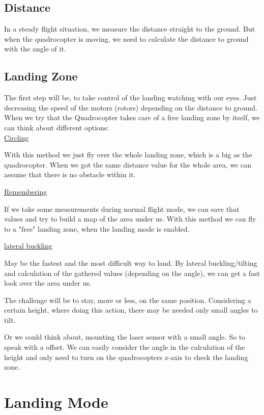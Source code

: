 \subsection{Distance}

In a steady flight situation, we measure the distance straight to the ground. But when the quadrocopter is moving, we need to calculate the distance to ground with the angle of it.


\subsection{Landing Zone}

The first step will be, to take control of the landing watching with our eyes. Just decreasing the speed of the motors (rotors) depending on the distance to ground.\\

When we try that the Quadrocopter takes care of a free landing zone by itself, we can think about different options:\\

\underline{Circling}

With this method we just fly over the whole landing zone, which is a big as the quadrocopter. When we got the same distance value for the whole area, we can assume that there is no obstacle within it.


\underline{Remembering}

If we take some measurements during normal flight mode, we can save that values and try to build a map of the area under us. With this method we can fly to a "free" landing zone, when the landing mode is enabled.

\underline{lateral buckling}

May be the fastest and the most difficult way to land. By lateral buckling/tilting and calculation of the gathered values (depending on the angle), we can get a fast look over the area under us.

The challenge will be to stay, more or less, on the same position. Considering a certain height, where doing this action, there may be needed only small angles to tilt.

Or we could think about, mounting the laser sensor with a small angle. So to speak with a offset. We can easily consider the angle in the calculation of the height and only need to turn on the quadrocopters z-axis to check the landing zone.

\newpage
\section{Landing Mode}

